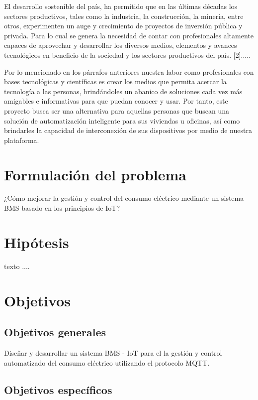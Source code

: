 El desarrollo sostenible del país, ha permitido que en las últimas décadas los sectores productivos, tales como la industria, la construcción, la minería, entre otros, experimenten un auge y crecimiento de proyectos de inversión pública y privada. Para lo cual se genera la necesidad de contar con profesionales altamente capaces de aprovechar y desarrollar los diversos medios, elementos y avances tecnológicos en beneficio de la sociedad y los sectores productivos del país. [2].....

Por lo mencionado en los párrafos anteriores nuestra labor como profesionales con bases tecnológicas y científicas es crear los medios que permita acercar la tecnología a las personas, brindándoles un abanico de soluciones cada vez más amigables e informativas para que puedan conocer y usar. Por tanto, este proyecto busca ser una alternativa para aquellas personas que buscan una solución de automatización inteligente para sus viviendas u oficinas, así como brindarles la capacidad de interconexión de sus dispositivos por medio de nuestra plataforma.

\section{Formulación del problema}

¿Cómo mejorar la gestión y control del consumo eléctrico mediante un sistema BMS basado en los principios de IoT?

\section{Hipótesis}

texto ....

\section{Objetivos}


\subsection{Objetivos generales}

Diseñar y desarrollar un sistema BMS - IoT para el la gestión y control 
automatizado del consumo eléctrico utilizando el protocolo MQTT.

\subsection{Objetivos específicos}

